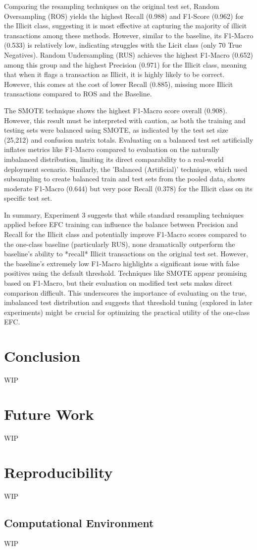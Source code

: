 \documentclass[12pt]{article}
\begin{document}
Comparing the resampling techniques on the original test set, Random Oversampling (ROS) yields the highest Recall (0.988)
and F1-Score (0.962) for the Illicit class, suggesting it is most effective at capturing the majority of illicit transactions
among these methods. However, similar to the baseline, its F1-Macro (0.533) is relatively low, indicating struggles with
the Licit class (only 70 True Negatives). Random Undersampling (RUS) achieves the highest F1-Macro (0.652) among this group
and the highest Precision (0.971) for the Illicit class, meaning that when it flags a transaction as Illicit, it is highly
likely to be correct. However, this comes at the cost of lower Recall (0.885), missing more Illicit transactions compared
to ROS and the Baseline.

The SMOTE technique shows the highest F1-Macro score overall (0.908). However, this result must be interpreted with caution,
as both the training and testing sets were balanced using SMOTE, as indicated by the test set size (25,212) and confusion
matrix totals. Evaluating on a balanced test set artificially inflates metrics like F1-Macro compared to evaluation on the
naturally imbalanced distribution, limiting its direct comparability to a real-world deployment scenario. Similarly, the
'Balanced (Artificial)' technique, which used subsampling to create balanced train and test sets from the pooled data,
shows moderate F1-Macro (0.644) but very poor Recall (0.378) for the Illicit class on its specific test set.

In summary, Experiment 3 suggests that while standard resampling techniques applied before EFC training can influence the
balance between Precision and Recall for the Illicit class and potentially improve F1-Macro scores compared to the one-class
baseline (particularly RUS), none dramatically outperform the baseline's ability to *recall* Illicit transactions on the
original test set. However, the baseline's extremely low F1-Macro highlights a significant issue with false positives using
the default threshold. Techniques like SMOTE appear promising based on F1-Macro, but their evaluation on modified test sets
makes direct comparison difficult. This underscores the importance of evaluating on the true, imbalanced test distribution
and suggests that threshold tuning (explored in later experiments) might be crucial for optimizing the practical utility
of the one-class EFC.

\section{Conclusion}
WIP

\section{Future Work}
WIP

\section{Reproducibility} \label{subsec:reproducibility}
WIP

\subsection{Computational Environment}
WIP



\end{document}
